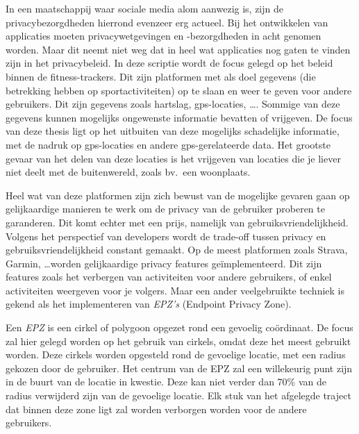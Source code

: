 
In een maatschappij waar sociale media alom aanwezig is, zijn de
privacybezorgdheden hierrond evenzeer erg actueel. Bij het ontwikkelen van
applicaties moeten privacywetgevingen en -bezorgdheden in acht genomen worden.
Maar dit neemt niet weg dat in heel wat applicaties nog gaten te vinden zijn in
het privacybeleid. In deze scriptie wordt de focus gelegd op het beleid binnen
de fitness-trackers. Dit zijn platformen met als doel gegevens (die betrekking
hebben op sportactiviteiten) op te slaan en weer te geven voor andere
gebruikers. Dit zijn gegevens zoals hartslag, \ac{gps}-locaties, \ldots.
Sommige van deze gegevens kunnen mogelijks ongewenste informatie bevatten of
vrijgeven. De focus van deze thesis ligt op het uitbuiten van deze mogelijks
schadelijke informatie, met de nadruk op gps-locaties en andere
gps-gerelateerde data. Het grootste gevaar van het delen van deze locaties is
het vrijgeven van locaties die je liever niet deelt met de buitenwereld, zoals
bv.\ een woonplaats.

Heel wat van deze platformen zijn zich bewust van de mogelijke gevaren gaan op
gelijkaardige manieren te werk om de privacy van de gebruiker proberen te
garanderen. Dit komt echter met een prijs, namelijk van
gebruiksvriendelijkheid. Volgens het perspectief van developers wordt de
trade-off tussen privacy en gebruiksvriendelijkheid constant gemaakt. Op de
meest platformen zoals Strava, Garmin, \ldots worden gelijkaardige privacy
features geïmplementeerd. Dit zijn features zoals het verbergen van
activiteiten voor andere gebruikers, of enkel activiteiten weergeven voor je
volgers. Maar een ander veelgebruikte techniek is gekend als het implementeren
van \textit{EPZ's} (Endpoint Privacy Zone).

Een \textit{EPZ} is een cirkel of polygoon opgezet rond een gevoelig
coördinaat. De focus zal hier gelegd worden op het gebruik van cirkels, omdat
deze het meest gebruikt worden. Deze cirkels worden opgesteld rond de gevoelige
locatie, met een radius gekozen door de gebruiker. Het centrum van de EPZ zal
een willekeurig punt zijn in de buurt van de locatie in kwestie. Deze kan niet
verder dan 70\% van de radius verwijderd zijn van de gevoelige locatie. Elk
stuk van het afgelegde traject dat binnen deze zone ligt zal worden verborgen
worden voor de andere gebruikers.

